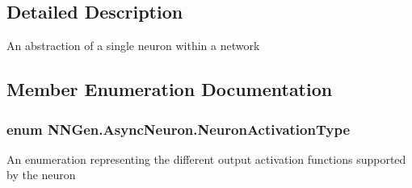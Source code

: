 \subsection{Detailed Description}
An abstraction of a single neuron within a network 



\subsection{Member Enumeration Documentation}
\hypertarget{class_n_n_gen_1_1_async_neuron_afe8460a52808d1587cbcc0a8e4e23b64}{}
\subsubsection[{Neuron\+Activation\+Type}]{\setlength{\rightskip}{0pt plus 5cm}enum {\bf N\+N\+Gen.\+Async\+Neuron.\+Neuron\+Activation\+Type}\hspace{0.3cm}{\ttfamily [strong]}}\label{class_n_n_gen_1_1_async_neuron_afe8460a52808d1587cbcc0a8e4e23b64}


An enumeration representing the different output activation functions supported by the neuron 

